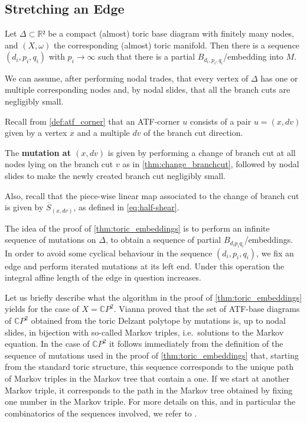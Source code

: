 \documentclass[12pt,a4paper,abstract=true,final]{scrartcl}
\begin{document}
\subsection{Stretching an Edge}
\label{sec:stretch_edge}

\begin{proposition}
  \label{thm:toric_embeddings}
  Let $Δ ⊂ ℝ²$ be a compact (almost) toric base diagram with finitely many nodes, and $(X,ω)$ the corresponding (almost) toric manifold.
  Then there is a sequence $(d_i,p_i,q_i)$ with $p_i → ∞$ such that there is a partial $B_{d_i,p_i,q_i}$\-/embedding into $M$.
\end{proposition}

We can assume, after performing nodal trades, that every vertex of $Δ$ has one or multiple corresponding nodes and, by nodal slides, that all the branch cuts are negligibly small.

Recall from \cref{def:atf_corner} that an ATF-corner $u$ consists of a pair $u=(x,dv)$ given by a vertex $x$ and a multiple $dv$ of the branch cut direction.

\begin{definition}
  \label{def:mutation_at_atf_corner}
  The \textbf{mutation at $(x,dv)$} is given by performing a change of branch cut at all nodes lying on the branch cut $v$ as in \cref{thm:change_branchcut}, followed by nodal slides to make the newly created branch cut negligibly small.
\end{definition}

Also, recall that the piece-wise linear map associated to the change of branch cut is given by $\overline{S}_{(x,dv)}$, as defined in \eqref{eq:half-shear}.

The idea of the proof of \cref{thm:toric_embeddings} is to perform an infinite sequence of mutations on $Δ$, to obtain a sequence of partial $B_{d_i p_i q_i}$\-/embeddings.
In order to avoid some cyclical behaviour in the sequence $(d_i,p_i,q_i)$, we fix an edge and perform iterated mutations at its left end.
Under this operation the integral affine length of the edge in question increases.

\begin{remark}
  Let us briefly describe what the algorithm in the proof of \cref{thm:toric_embeddings} yields for the case of $X = \mathbb{C}P^2$.
  Vianna \cite{Via16} proved that the set of ATF-base diagrams of $\mathbb{C}P^2$ obtained from the toric Delzant polytope by mutations is, up to nodal slides, in bijection with so-called Markov triples, i.e.\ solutions to the Markov equation.
  In the case of $\mathbb{C}P^2$ it follows immediately from the definition of the sequence of mutations used in the proof of \cref{thm:toric_embeddings} that, starting from the standard toric structure, this sequence corresponds to the unique path of Markov triples in the Markov tree that contain a one.
  If we start at another Markov triple, it corresponds to the path in the Markov tree obtained by fixing one number in the Markov triple.
For more details on this, and in particular the combinatorics of the sequences involved, we refer to \cite[Section~8.4, Appendix~I]{evans2021atfs}.
\end{remark}
\end{document}
